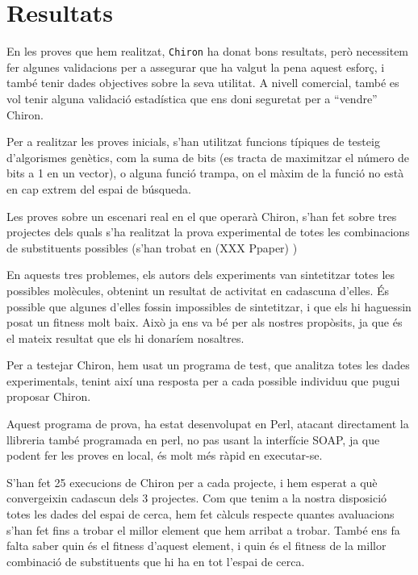 \section{Resultats} %
	\label{sec:Resultats}

	En les proves que hem realitzat, \texttt{Chiron} ha donat bons resultats,
	però necessitem fer algunes validacions per a assegurar que ha valgut la
	pena aquest esforç, i també tenir dades objectives sobre la seva utilitat.
	A nivell comercial, també es vol tenir alguna validació estadística que ens
	doni seguretat per a ``vendre'' Chiron.

	Per a realitzar les proves inicials, s'han utilitzat funcions típiques de
	testeig d'algorismes genètics, com la suma de bits (es tracta de maximitzar
	el número de bits a 1 en un vector), o alguna funció trampa, on el màxim de
	la funció no està en cap extrem del espai de búsqueda.

	Les proves sobre un escenari real en el que operarà Chiron, s'han fet sobre
	tres projectes dels quals s'ha realitzat la prova experimental de totes les
	combinacions de substituents possibles (s'han trobat en (XXX Ppaper) )

	En aquests tres problemes, els autors dels experiments van sintetitzar totes
	les possibles molècules, obtenint un resultat de activitat en cadascuna
	d'elles.  És possible que algunes d'elles fossin impossibles de sintetitzar,
	i que els hi haguessin posat un fitness molt baix.  Això ja ens va bé per
	als nostres propòsits, ja que és el mateix resultat que els hi donaríem
	nosaltres.

	Per a testejar Chiron, hem usat un programa de test, que analitza totes les
	dades experimentals, tenint així una resposta per a cada possible individuu
	que pugui proposar Chiron.

	Aquest programa de prova, ha estat desenvolupat en Perl, atacant directament
	la llibreria també programada en perl, no pas usant la interfície SOAP, ja
	que podent fer les proves en local, és molt més ràpid en executar-se.

	S'han fet 25 execucions de Chiron per a cada projecte, i hem
	esperat a què convergeixin cadascun dels 3 projectes.  Com que tenim a la
	nostra disposició totes les dades del espai de cerca, hem fet càlculs
	respecte quantes avaluacions s'han fet fins a trobar el millor element que
	hem arribat a trobar.  També ens fa falta saber quin és el fitness d'aquest
	element, i quin és el fitness de la millor combinació de substituents que
	hi ha en tot l'espai de cerca. 

